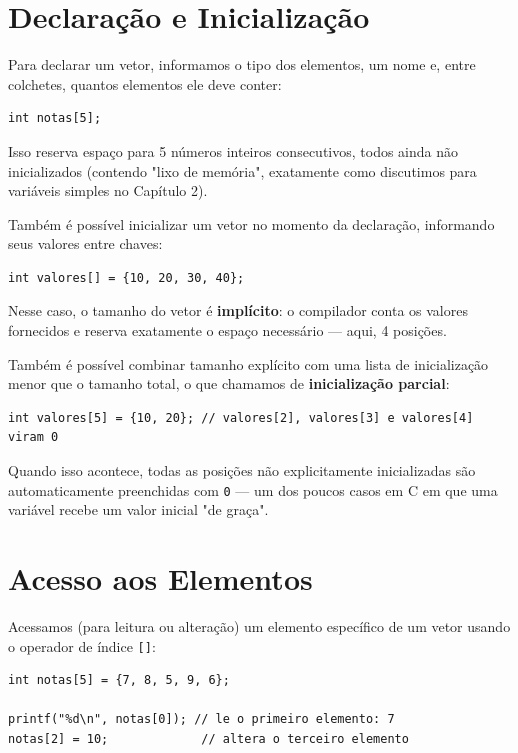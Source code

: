 \documentclass[12pt,a4paper,oneside]{extreport}
\begin{document}
\section{Declaração e Inicialização}

Para declarar um vetor, informamos o tipo dos elementos, um nome e, entre colchetes, quantos elementos ele deve conter:

\begin{lstlisting}
int notas[5];
\end{lstlisting}

Isso reserva espaço para 5 números inteiros consecutivos, todos ainda não inicializados (contendo "lixo de memória", exatamente como discutimos para variáveis simples no Capítulo 2).

Também é possível inicializar um vetor no momento da declaração, informando seus valores entre chaves:

\begin{lstlisting}
int valores[] = {10, 20, 30, 40};
\end{lstlisting}

Nesse caso, o tamanho do vetor é \textbf{implícito}: o compilador conta os valores fornecidos e reserva exatamente o espaço necessário — aqui, 4 posições.

Também é possível combinar tamanho explícito com uma lista de inicialização menor que o tamanho total, o que chamamos de \textbf{inicialização parcial}:

\begin{lstlisting}
int valores[5] = {10, 20}; // valores[2], valores[3] e valores[4] viram 0
\end{lstlisting}

Quando isso acontece, todas as posições não explicitamente inicializadas são automaticamente preenchidas com \texttt{0} — um dos poucos casos em C em que uma variável recebe um valor inicial "de graça".

\section{Acesso aos Elementos}

Acessamos (para leitura ou alteração) um elemento específico de um vetor usando o operador de índice \texttt{[]}:

\begin{lstlisting}
int notas[5] = {7, 8, 5, 9, 6};

printf("%d\n", notas[0]); // le o primeiro elemento: 7
notas[2] = 10;             // altera o terceiro elemento
\end{lstlisting}
\end{document}
